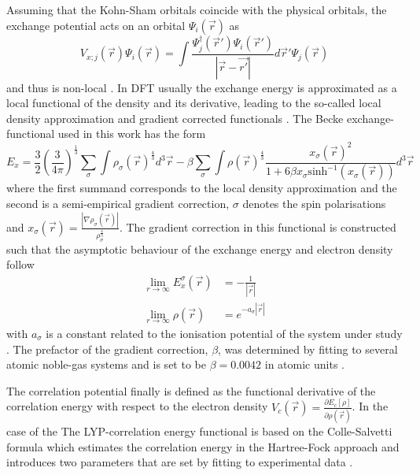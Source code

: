 Assuming that the Kohn-Sham orbitals coincide with the physical orbitals, the exchange potential acts on an orbital $\Psi_i(\vec{r})$ as
\begin{equation} \label{eq:HF_exch}
V_{x;j}(\vec{r})\Psi_i(\vec{r}) =\int \frac{\Psi_j^\dagger(\vec{r}') \Psi_i(\vec{r}')}{\left|\vec{r}-\vec{r'}\right|} d\vec{r}' \Psi_j(\vec{r})
\end{equation}
and thus is non-local \cite{Holthausen}. %
In DFT usually the exchange energy is approximated as a local functional of the density and its derivative, leading to the so-called local density approximation and gradient corrected functionals \cite{baerRSH}.
The Becke \cite{blyp} exchange-functional used in this work has the form
\begin{equation} \label{eq:blypXC}
E_x=\frac 32 \left(\frac{3}{4\pi}\right)^\frac 13 \sum_\sigma \int \rho_\sigma(\vec{r})^\frac 43 d^3\vec{r} 
-\beta \sum_\sigma \int \rho(\vec{r})^\frac 43 \frac{x_\sigma(\vec{r})^2}{1+6\beta x_\sigma \text{sinh}^{-1}( x_\sigma (\vec{r}))} d^3\vec{r}
\end{equation}
where the first summand corresponds to the local density approximation and the second is a semi-empirical gradient correction, $\sigma$ denotes the spin polarisations and $x_\sigma(\vec{r})=\frac{|\nabla \rho_\sigma(\vec{r})|}{\rho_\sigma^\frac 43}$. 
The gradient correction in this functional is constructed such that the asymptotic behaviour of the exchange energy and electron density follow
\begin{align}
  \lim_{r\rightarrow\infty} E_x^\sigma(\vec{r}) & =-\frac{1}{|\vec{r}|} \\
  \lim_{r\rightarrow\infty} \rho(\vec{r}) & =e^{-a_\sigma |\vec{r}|}
\end{align}
with $a_\sigma$ is a constant related to the ionisation potential of the system under study \cite{blyp}.
The prefactor of the gradient correction, $\beta$, was determined by fitting to several atomic noble-gas systems and is set to be $\beta=0.0042$ in atomic units \cite{blyp}.

The correlation potential finally is defined as the functional derivative of the correlation energy with respect to the electron density $V_c(\vec{r})=\frac{\partial E_c[\rho]}{\partial\rho(\vec{r})}$.
In the case of the
The LYP-correlation energy functional is based on the Colle-Salvetti formula which estimates the correlation energy in the Hartree-Fock approach and introduces two parameters that are set by fitting to experimental data \cite{lyp}.

